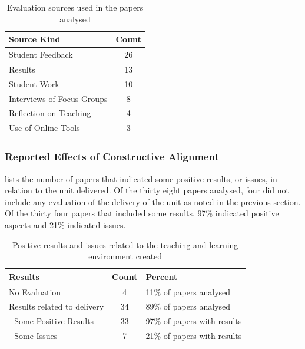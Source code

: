 \begin{table}[b]
	\centering
	\caption{Evaluation sources used in the papers analysed}
	\label{tbl:eval_kind}
	\footnotesize
    \begin{tabular}{l|c}
     \textbf{Source Kind} & \textbf{Count} \\ \hline
		Student Feedback	 & 26 \\
		Results	 & 13 \\
		Student Work	 & 10 \\
		Interviews of Focus Groups & 	8 \\
		Reflection on Teaching & 	4 \\
		Use of Online Tools & 	3 \\
    \end{tabular}
\end{table}





\subsubsection{Reported Effects of Constructive Alignment} %
\label{sub:effects_of_constructive_alignment}

 lists the number of papers that indicated some positive results, or issues, in relation to the unit delivered. Of the thirty eight papers analysed, four did not include any evaluation of the delivery of the unit as noted in the previous section. Of the thirty four papers that included some results, 97\% indicated positive aspects and 21\% indicated issues.

\begin{table}[hbp]
	\centering
	\caption{Positive results and issues related to the teaching and learning environment created}
	\label{tbl:paper_results}
	\footnotesize
    \begin{tabular}{l|c|l}
     \textbf{Results} & \textbf{Count} & \textbf{Percent} \\ \hline
		No Evaluation & 	4 &	11\% of papers analysed \\
     	Results related to delivery & 34 & 89\% of papers analysed \\
		- Some Positive Results	 & 33 &	97\% of papers with results \\
		- Some Issues & 	7 &	21\% of papers with results  \\
    \end{tabular}
\end{table}


